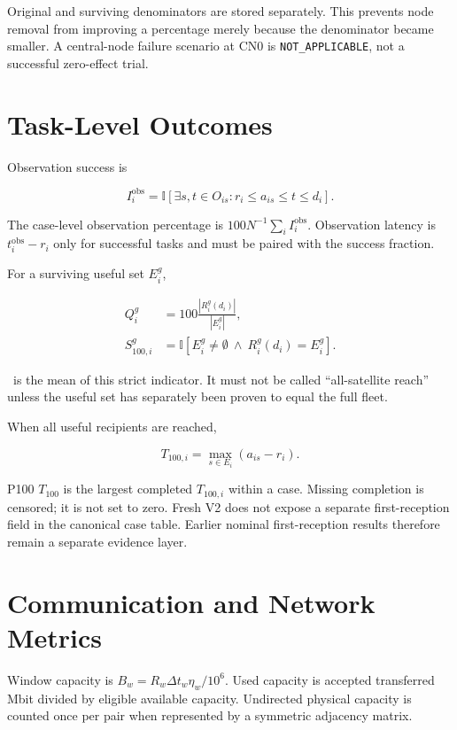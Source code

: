 Original and surviving denominators are stored separately. This prevents node removal from improving a percentage merely because the denominator became smaller. A central-node failure scenario at CN0 is \texttt{NOT\_APPLICABLE}, not a successful zero-effect trial.

\section{Task-Level Outcomes}

Observation success is

\begin{equation}
I_i^{\mathrm{obs}}=\mathbb{I}\!\left[\exists s,t\in O_{is}:r_i\le a_{is}\le t\le d_i\right].
\end{equation}

The case-level observation percentage is $100N^{-1}\sum_i I_i^{\mathrm{obs}}$. Observation latency is $t_i^{\mathrm{obs}}-r_i$ only for successful tasks and must be paired with the success fraction.

For a surviving useful set $E_i^g$,

\begin{align}
Q_i^g &= 100\frac{|R_i^g(d_i)|}{|E_i^g|},\\
S_{100,i}^{g} &= \mathbb{I}[E_i^g\ne\emptyset\ \land\ R_i^g(d_i)=E_i^g].
\end{align}

\Suseful\ is the mean of this strict indicator. It must not be called ``all-satellite reach'' unless the useful set has separately been proven to equal the full fleet.

When all useful recipients are reached,

\begin{equation}
T_{100,i} = \max_{s\in E_i}(a_{is}-r_i).
\end{equation}

P100 $T_{100}$ is the largest completed $T_{100,i}$ within a case. Missing completion is censored; it is not set to zero. Fresh V2 does not expose a separate first-reception field in the canonical case table. Earlier nominal first-reception results therefore remain a separate evidence layer.

\section{Communication and Network Metrics}

Window capacity is $B_w=R_w\Delta t_w\eta_w/10^6$. Used capacity is accepted transferred Mbit divided by eligible available capacity. Undirected physical capacity is counted once per pair when represented by a symmetric adjacency matrix.

